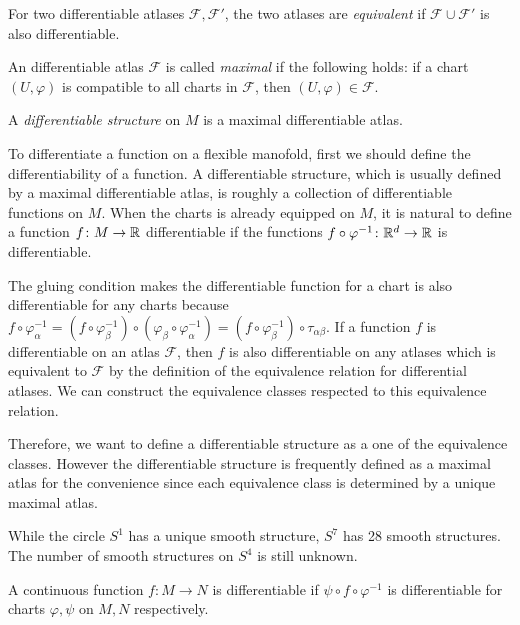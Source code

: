 \documentclass[11pt]{article}
\begin{document}
\begin{defn}
For two differentiable atlases $\mathcal{F},\mathcal{F}'$, the two atlases are \emph{equivalent} if $\mathcal{F}\cup\mathcal{F}'$ is also differentiable.
\end{defn}

\begin{defn}
An differentiable atlas $\mathcal{F}$ is called \emph{maximal} if the following holds:
if a chart $(U,\varphi)$ is compatible to all charts in $\mathcal{F}$, then $(U,\varphi)\in\mathcal{F}$.
\end{defn}

\begin{defn}
A \emph{differentiable structure} on $M$ is a maximal differentiable atlas.
\end{defn}

To differentiate a function on a flexible manofold, first we should define the differentiability of a function.
A differentiable structure, which is usually defined by a maximal differentiable atlas, is roughly a collection of differentiable functions on $M$.
When the charts is already equipped on $M$, it is natural to define a function $f\colon M\to\R$ differentiable if the functions $f\circ\varphi^{-1}\colon\R^d\to\R$ is differentiable.

The gluing condition makes the differentiable function for a chart is also differentiable for any charts because $f\circ\varphi_\alpha^{-1}=(f\circ\varphi_\beta^{-1})\circ(\varphi_\beta\circ\varphi_\alpha^{-1})
=(f\circ\varphi_\beta^{-1})\circ\tau_{\alpha\beta}$.
If a function $f$ is differentiable on an atlas $\mathcal{F}$, then $f$ is also differentiable on any atlases which is equivalent to $\mathcal{F}$ by the definition of the equivalence relation for differential atlases.
We can construct the equivalence classes respected to this equivalence relation.

Therefore, we want to define a differentiable structure as a one of the equivalence classes.
However the differentiable structure is frequently defined as a maximal atlas for the convenience since each equivalence class is determined by a unique maximal atlas.

\begin{ex}
While the circle $S^1$ has a unique smooth structure, $S^7$ has 28 smooth structures.
The number of smooth structures on $S^4$ is still unknown.
\end{ex}

\begin{defn}
A continuous function $f\colon M\to N$ is differentiable if $\psi\circ f\circ\varphi^{-1}$ is differentiable for charts $\varphi,\psi$ on $M,N$ respectively.
\end{defn}
\end{document}
